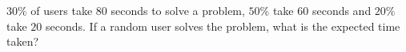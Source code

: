 $30\%$ of users take $80$ seconds to solve a problem, $50\%$ take $60$ seconds and $20\%$ take $20$ seconds. If a random user solves the problem, what is the expected time taken?
